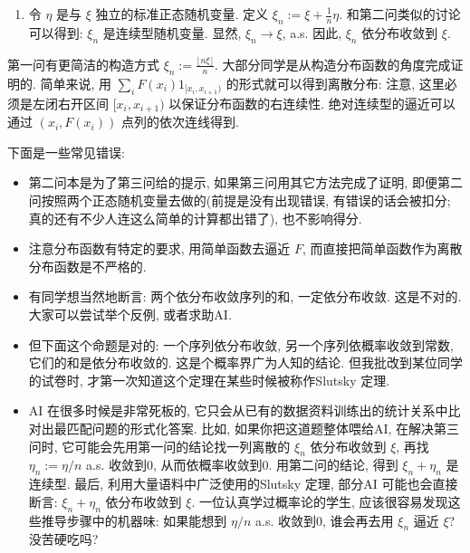 \begin{enumerate}
\begin{proofc}
\begin{enumerate}[label=(\arabic*)]
\item 令 $\eta$ 是与 $\xi$ 独立的标准正态随机变量. 定义 $\xi_{n}:=\xi+\frac{1}{n} \eta$. 
和第二问类似的讨论可以得到: $\xi_{n}$ 是连续型随机变量. 显然, $\xi_{n} \to \xi$, a.s. 因此, $\xi_{n}$ 依分布收敛到 $\xi$.
\end{enumerate}


第一问有更简洁的构造方式 $\xi_{n}:=\frac{\lfloor n \xi\rfloor}{n}$. 大部分同学是从构造分布函数的角度完成证明的. 简单来说, 用 $\sum_{i} F(x_{i}) 1_{[x_{i}, x_{i+1})}$ 的形式就可以得到离散分布: 注意, 这里必须是左闭右开区间 $[x_{i}, x_{i+1})$ 以保证分布函数的右连续性. 绝对连续型的逼近可以通过 $(x_{i}, F(x_{i}))$ 点列的依次连线得到.

下面是一些常见错误:
\begin{itemize}
\item 第二问本是为了第三问给的提示, 如果第三问用其它方法完成了证明, 即便第二问按照两个正态随机变量去做的(前提是没有出现错误, 有错误的话会被扣分; 真的还有不少人连这么简单的计算都出错了), 也不影响得分.
\item 注意分布函数有特定的要求, 用简单函数去逼近 $F$, 而直接把简单函数作为离散分布函数是不严格的.
\item 有同学想当然地断言: 两个依分布收敛序列的和, 一定依分布收敛. 这是不对的. 大家可以尝试举个反例, 或者求助AI.
\item 但下面这个命题是对的: 一个序列依分布收敛, 另一个序列依概率收敛到常数, 它们的和是依分布收敛的. 这是个概率界广为人知的结论. 但我批改到某位同学的试卷时, 才第一次知道这个定理在某些时候被称作Slutsky 定理.
\item AI 在很多时候是非常死板的, 它只会从已有的数据资料训练出的统计关系中比对出最匹配问题的形式化答案. 
比如, 如果你把这道题整体喂给AI, 在解决第三问时, 它可能会先用第一问的结论找一列离散的 $\xi_{n}$ 依分布收敛到 $\xi$, 再找 $\eta_{n}:=\eta / n$ a.s. 收敛到$0$, 从而依概率收敛到$0$. 
用第二问的结论, 得到 $\xi_{n}+\eta_{n}$ 是连续型. 最后, 利用大量语料中广泛使用的Slutsky 定理, 部分AI 可能也会直接断言: $\xi_{n}+\eta_{n}$ 依分布收敛到 $\xi$. 
一位认真学过概率论的学生, 应该很容易发现这些推导步骤中的机器味: 如果能想到 $\eta / n$ a.s. 收敛到$0$, 谁会再去用 $\xi_{n}$ 逼近 $\xi$? 没苦硬吃吗?\qedhere
\end{itemize}
\end{proofc}


\end{enumerate}
